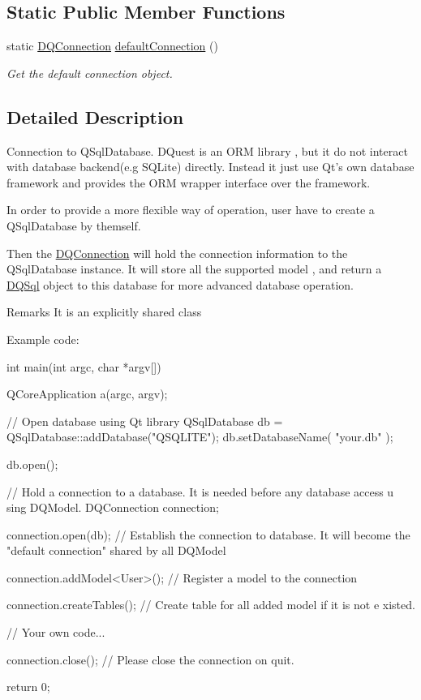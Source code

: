 \subsection*{Static Public Member Functions}
\begin{DoxyCompactItemize}
\item 
static \hyperlink{classDQConnection}{DQConnection} \hyperlink{classDQConnection_a95f1d7b3baf3c78e38c1f9e11ed71948}{defaultConnection} ()
\begin{DoxyCompactList}\small\item\em Get the default connection object. \item\end{DoxyCompactList}\end{DoxyCompactItemize}


\subsection{Detailed Description}
Connection to QSqlDatabase. DQuest is an ORM library , but it do not interact with database backend(e.g SQLite) directly. Instead it just use Qt's own database framework and provides the ORM wrapper interface over the framework.

In order to provide a more flexible way of operation, user have to create a QSqlDatabase by themself.

Then the \hyperlink{classDQConnection}{DQConnection} will hold the connection information to the QSqlDatabase instance. It will store all the supported model , and return a \hyperlink{classDQSql}{DQSql} object to this database for more advanced database operation.

\begin{DoxyRemark}{Remarks}
It is an explicitly shared class
\end{DoxyRemark}
Example code: 
\begin{DoxyCode}
int main(int argc, char *argv[])
{
    QCoreApplication a(argc, argv);

    // Open database using Qt library
    QSqlDatabase db = QSqlDatabase::addDatabase("QSQLITE");
    db.setDatabaseName( "your.db" );

    db.open();

    // Hold a connection to a database. It is needed before any database access u
      sing DQModel.
    DQConnection connection;

    connection.open(db); // Establish the connection to database. It will become 
      the "default connection" shared by all DQModel

    connection.addModel<User>(); // Register a model to the connection

    connection.createTables(); // Create table for all added model if it is not e
      xisted.

    // Your own code...

    connection.close(); // Please close the connection on quit.

    return 0;

}
\end{DoxyCode}
 

